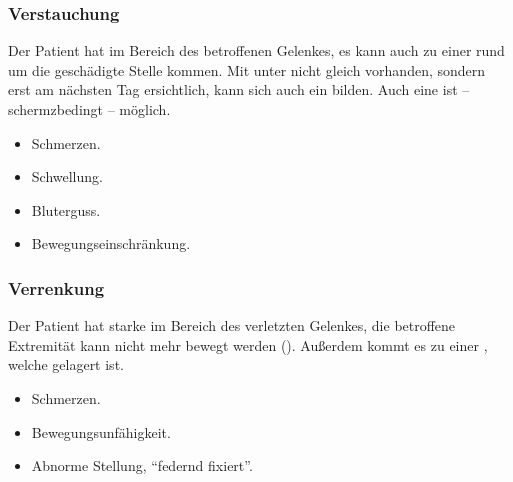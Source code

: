 \subsubsection{Verstauchung}


{
Der Patient hat  im Bereich des betroffenen Gelenkes, es
kann auch zu einer  rund um die geschädigte Stelle kommen. Mit
unter nicht gleich vorhanden, sondern erst am nächsten Tag ersichtlich,
kann sich auch ein  bilden. Auch eine  ist -- schermzbedingt -- möglich. 
}{
\begin{itemize}
    \item Schmerzen.
    \item Schwellung.
    \item Bluterguss.
    \item Bewegungseinschränkung.
\end{itemize}
}{}{}{}



\subsubsection{Verrenkung}




{
Der Patient hat starke  im Bereich des verletzten Gelenkes,
die betroffene Extremität kann nicht mehr bewegt werden
(). Außerdem kommt es zu einer , welche  gelagert ist. 
}{
\begin{itemize}
    \item Schmerzen.
    \item Bewegungsunfähigkeit.
    \item Abnorme Stellung, "`federnd fixiert"'.
\end{itemize}
}{}{}{}

